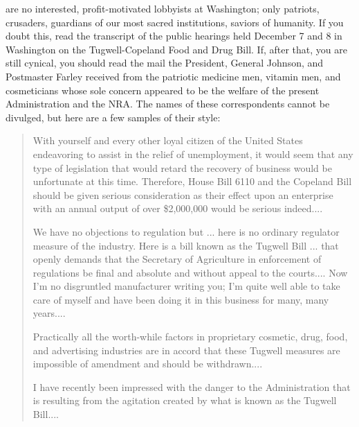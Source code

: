 \documentclass[openany,nobib]{tufte-book}
\begin{document}
 are no interested, profit-motivated lobbyists at Washington; only
patriots, crusaders, guardians of our most sacred institutions, saviors
of humanity. If you doubt this, read the transcript of the public
hearings held December 7 and 8 in Washington on the Tugwell-Copeland
Food and Drug Bill. If, after that, you are still cynical, you should
read the mail the President, General Johnson, and Postmaster Farley
received from the patriotic medicine men, vitamin men, and cosmeticians
whose sole concern appeared to be the welfare of the present
Administration and the NRA. The names of these correspondents cannot be
divulged, but here are a few samples of their style:

\begin{quote}
With yourself and every other loyal citizen of the United States
endeavoring to assist in the relief of unemployment, it would seem that
any type of legislation that would retard the recovery of business would
be unfortunate at this time. Therefore, House Bill 6110 and the Copeland
Bill should be given serious consideration as their effect upon an
enterprise with an annual output of over \$2,000,000 would be serious
indeed....

We have no objections to regulation but ... here is no ordinary
regulator measure of the industry. Here is a bill known as the Tugwell
Bill ... that openly demands that the Secretary of Agriculture in
enforcement of regulations be final and absolute and without appeal to
the courts.... Now I'm no disgruntled manufacturer writing you; I'm
quite well able to take care of myself and have been doing it in this
business for many, many years....

Practically all the worth-while factors in proprietary cosmetic, drug,
food, and advertising industries are in accord that these Tugwell
measures are impossible of amendment and should be withdrawn....

I have recently been impressed with the danger to the Administration
that is resulting from the agitation created by what is known as the
Tugwell Bill....
\end{quote}
\end{document}
